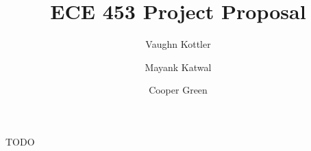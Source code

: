 \documentclass{beamer}
\title{ECE 453 Project Proposal}
\author{Vaughn Kottler}
\author{Mayank Katwal}
\author{Cooper Green}
\begin{document}
TODO
\end{document}
